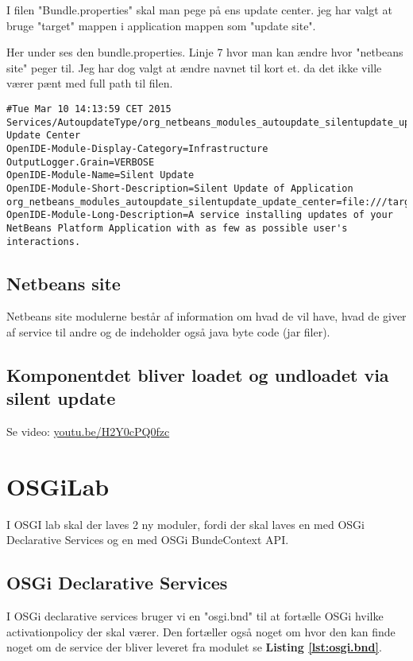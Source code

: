 I filen "Bundle.properties" skal man pege på ens update center. jeg har valgt at 
bruge "target" mappen i application mappen som "update site". 

Her under ses den bundle.properties. Linje 7 hvor man kan ændre hvor "netbeans
site" peger til.  Jeg har dog valgt at ændre navnet til kort et. da det ikke
ville værer pænt med full path til filen.

\begin{lstlisting}[caption={Bundle.properties}, label={lst:App}]
#Tue Mar 10 14:13:59 CET 2015
Services/AutoupdateType/org_netbeans_modules_autoupdate_silentupdate_update_center.instance=Sample Update Center
OpenIDE-Module-Display-Category=Infrastructure
OutputLogger.Grain=VERBOSE
OpenIDE-Module-Name=Silent Update
OpenIDE-Module-Short-Description=Silent Update of Application
org_netbeans_modules_autoupdate_silentupdate_update_center=file:///target/netbeans_site/updates.xml
OpenIDE-Module-Long-Description=A service installing updates of your NetBeans Platform Application with as few as possible user's interactions.
\end{lstlisting}

\subsection{Netbeans site}
Netbeans site modulerne består af information om hvad de vil have, hvad de giver
af service til andre og de indeholder også java byte code (jar filer).

\subsection{Komponentdet bliver loadet og undloadet via silent update}
Se video: \href{https://www.youtube.com/watch?v=H2Y0cPQ0fzc}{youtu.be/H2Y0cPQ0fzc}


\newpage
\section{OSGiLab}
I OSGI lab skal der laves 2 ny moduler, fordi der skal laves en med OSGi
Declarative Services og en med OSGi BundeContext API.

\subsection{OSGi Declarative Services}
I OSGi declarative services bruger vi en "osgi.bnd" til at fortælle OSGi hvilke
activationpolicy der skal værer. Den fortæller også noget om hvor den kan finde
noget om de service der bliver leveret fra modulet se \textbf{Listing
\ref{lst:osgi.bnd}}.

